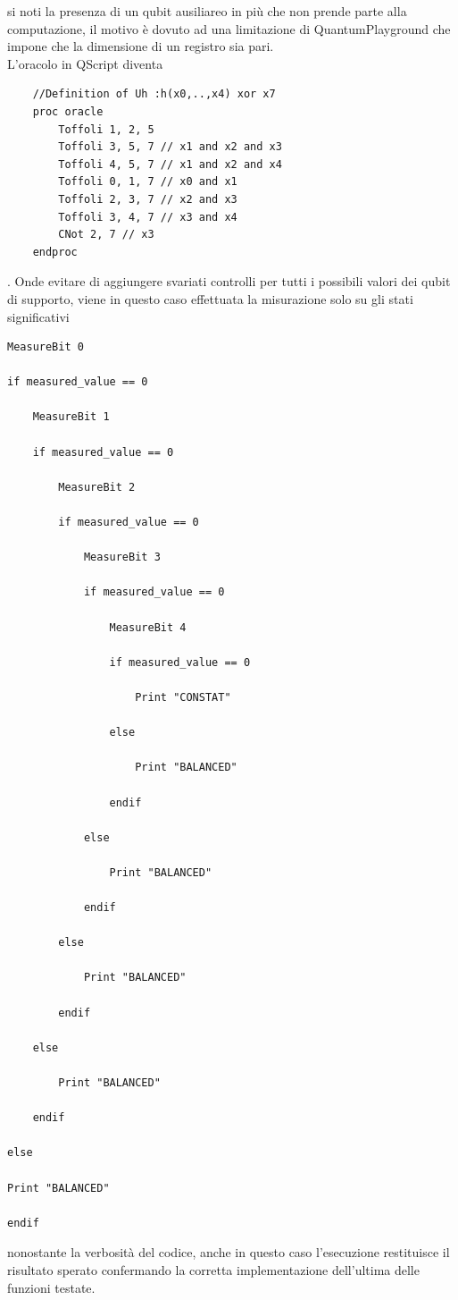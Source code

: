 \documentclass[12pt,a4paper,openright]{report}
\begin{document}
si noti la presenza di un qubit ausiliareo in più che non prende parte alla computazione, il motivo è dovuto ad una limitazione
di QuantumPlayground che impone che la dimensione di un registro sia pari.\\
L'oracolo in QScript diventa

\begin{lstlisting}
    //Definition of Uh :h(x0,..,x4) xor x7
    proc oracle
        Toffoli 1, 2, 5
        Toffoli 3, 5, 7 // x1 and x2 and x3
        Toffoli 4, 5, 7 // x1 and x2 and x4 
        Toffoli 0, 1, 7 // x0 and x1
        Toffoli 2, 3, 7 // x2 and x3
        Toffoli 3, 4, 7 // x3 and x4
        CNot 2, 7 // x3
    endproc
\end{lstlisting}

.  Onde evitare di aggiungere svariati controlli per tutti i possibili valori dei qubit di supporto, viene in questo caso effettuata
la misurazione solo su gli stati significativi

\begin{lstlisting}
MeasureBit 0

if measured_value == 0 

	MeasureBit 1

	if measured_value == 0 

		MeasureBit 2

		if measured_value == 0

			MeasureBit 3

			if measured_value == 0 

				MeasureBit 4

				if measured_value == 0 

					Print "CONSTAT"

				else

					Print "BALANCED"

				endif

			else

				Print "BALANCED"

			endif

		else

			Print "BALANCED"

		endif

	else

		Print "BALANCED"

	endif

else

Print "BALANCED"

endif
\end{lstlisting}
nonostante la verbosità del codice, anche in questo caso l'esecuzione restituisce il risultato sperato confermando la corretta
implementazione dell'ultima delle funzioni testate.
\end{document}
